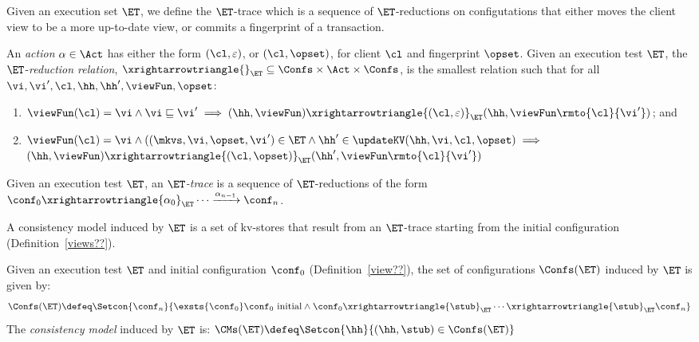 \noindent Given an execution set  $\ET$, we define the $\ET$-trace which is a
sequence of $\ET$-reductions on configutations that either moves the
client view to be a more up-to-date view, or commits a fingerprint of
a transaction. 

\begin{definition}[$\ET$-trace]
\label{def:reduction}
An \emph{action} $\alpha \in \Act$ has either the form $(\cl, \varepsilon)$, 
or $(\cl, \opset)$, for client 
$\cl$ and fingerprint $\opset$. 
Given an execution test $\ET$, the $\ET$-\emph{reduction relation},
$\xrightarrowtriangle{}_{\ET} \subseteq \Confs \times \Act \times \Confs$, 
is the smallest relation such that for all $\vi, \vi', \cl, \hh, \hh', \viewFun, \opset$:
\begin{enumerate}
	\item 
    $
    \viewFun(\cl) = \vi 
    \wedge \vi \sqsubseteq \vi' 
    \implies (\hh, \viewFun) \xrightarrowtriangle{(\cl, \varepsilon)}_{\ET} 
    (\hh, \viewFun\rmto{\cl}{\vi'})$; and
	\item 
    $\viewFun(\cl) = \vi
        \wedge ((\mkvs, \vi,
\opset, \vi') \in \ET
        \wedge \hh' \in \updateKV(\hh, \vi, \cl, \opset) \implies
	$  \\
	\phantom{a} \hfill 
	$(\hh, \viewFun) \xrightarrowtriangle{(\cl, \opset)}_{\ET} (\hh', \viewFun\rmto{\cl}{\vi'})$
\end{enumerate}
Given an execution test $\ET$, an \emph{$\ET$-trace} is a sequence of $\ET$-reductions of the form $\conf_{0} \xrightarrowtriangle{\alpha_{0}}_{\ET} \cdots 
\xrightarrow{\alpha_{n-1}} \conf_{n}$.
\end{definition}





\noindent A consistency model induced by $\ET$ is a set of kv-stores
that  result from
an $\ET$-trace starting from the 
initial configuration (Definition~\ref{views??}). 

\begin{definition}
\label{def:cm}
Given an execution test $\ET$ and initial configuration $\conf_0$ (Definition~\ref{view??}),
the set of configurations $\Confs(\ET) $   induced by $\ET$ is   given by: 
\[
\Confs(\ET)\defeq \Setcon{ \conf_n}{ \exsts{\conf_0} \conf_0 \text{ 
    initial}  \wedge \conf_0 \xrightarrowtriangle{\stub}_{\ET} \cdots
  \xrightarrowtriangle{\stub}_{\ET} \conf_n }
\]
The \emph{consistency model} induced by $\ET$ is:
\( 
\CMs(\ET) \defeq \Setcon{ \hh }{ (\hh, \stub) \in \Confs(\ET) }
\)
\end{definition}

